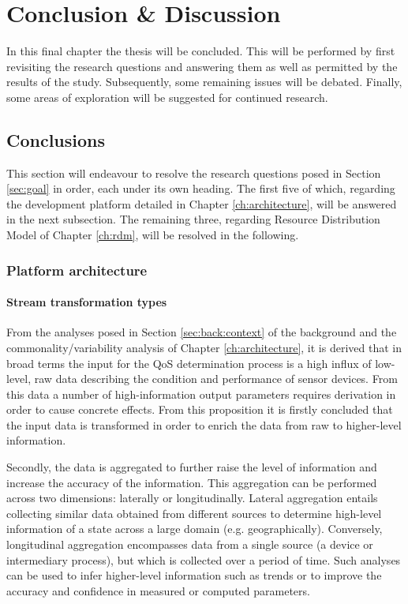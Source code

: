 
\chapter{Conclusion \& Discussion}
In this final chapter the thesis will be concluded. This will be performed by first revisiting the research questions and answering them as well as permitted by the results of the study. Subsequently, some remaining issues will be debated. Finally, some areas of exploration will be suggested for continued research.

\section{Conclusions}
\label{sec:conclusions}
This section will endeavour to resolve the research questions posed in Section \ref{sec:goal} in order, each under its own heading. The first five of which, regarding the development platform detailed in Chapter \ref{ch:architecture}, will be answered in the next subsection. The remaining three, regarding Resource Distribution Model of Chapter \ref{ch:rdm}, will be resolved in the following.
\subsection{Platform architecture}
\subsubsection{Stream transformation types}
From the analyses posed in Section \ref{sec:back:context} of the background and the commonality/variability analysis of Chapter \ref{ch:architecture}, it is derived that in broad terms the input for the QoS determination process is a high influx of low-level, raw data describing the condition and performance of sensor devices. From this data a number of high-information output parameters requires derivation in order to cause concrete effects. From this proposition it is firstly concluded that the input data is transformed in order to enrich the data from raw to higher-level information.

Secondly, the data is aggregated to further raise the level of information and increase the accuracy of the information. This aggregation can be performed across two dimensions: laterally or longitudinally. Lateral aggregation entails collecting similar data obtained from different sources to determine high-level information of a state across a large domain (e.g. geographically). Conversely, longitudinal aggregation encompasses data from a single source (a device or intermediary process), but which is collected over a period of time. Such analyses can be used to infer higher-level information such as trends or to improve the accuracy and confidence in measured or computed parameters.

